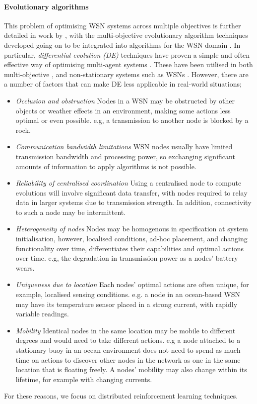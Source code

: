 \paragraph{Evolutionary algorithms}

This problem of optimising WSN systems across multiple objectives is further detailed in work by \citep{ s150717572}, with the multi-objective evolutionary algorithm techniques developed going on to be integrated into algorithms for the WSN domain \citep{4633340,SENGUPTA2013405}. In particular, \textit{differential evolution (DE)} techniques have proven a simple and often effective way of optimising multi-agent systems \citep{Suganthan2012,Godzik2019, Opara2019}. These have been utilised in both multi-objective \citep{Mohd2020}, and non-stationary \cite{Cep2017,Zhang2020a} systems such as WSNs \citep{Xu2013}. However, there are a number of factors that can make DE less applicable in real-world situations;
\begin{itemize}
	\item \textit{Occlusion and obstruction} Nodes in a WSN may be obstructed by other objects or weather effects in an environment, making some actions less optimal or even possible. e.g, a transmission to another node is blocked by a rock.

	\item \textit{Communication bandwidth limitations} WSN nodes usually have limited transmission bandwidth and processing power, so exchanging significant amounts of information to apply algorithms is not possible. 
	
	\item \textit{Reliability of centralised coordination} Using a centralised node to compute evolutions will involve significant data transfer, with nodes required to relay data in larger systems due to transmission strength. In addition, connectivity to such a node may be intermittent. 
	
	\item \textit{Heterogeneity of nodes} Nodes may be homogenous in specification at system initialisation, however, localised conditions, ad-hoc placement, and changing functionality over time, differentiates their capabilities and optimal actions over time. e.g, the degradation in transmission power as a nodes' battery wears.
	
	\item \textit{Uniqueness due to location} Each nodes' optimal actions are often unique, for example, localised sensing conditions. e.g. a node in an ocean-based WSN may have its temperature sensor placed in a strong current, with rapidly variable readings.
	
	\item \textit{Mobility} Identical nodes in the same location may be mobile to different degrees and would need to take different actions. e.g a node attached to a stationary buoy in an ocean environment does not need to spend as much time on actions to discover other nodes in the network as one in the same location that is floating freely. A nodes' mobility may also change within its lifetime, for example with changing currents.
\end{itemize}
For these reasons, we focus on distributed reinforcement learning techniques.

